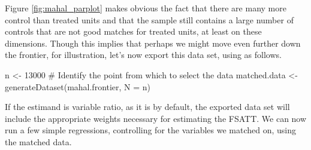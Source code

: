 \documentclass[nojss]{jss}
\begin{document}
Figure \ref{fig:mahal_parplot} makes obvious the fact that there are many more control than 
treated units and that the sample still contains a large number of controls that are
not good matches for treated units, at least on these dimensions. Though this implies that
perhaps we might move even further down the frontier, for illustration, let's now export
this data set, using  as follows.

\begin{CodeChunk}
\begin{CodeInput}
n <- 13000 # Identify the point from which to select the data
matched.data <- generateDataset(mahal.frontier, N = n)
\end{CodeInput}
\end{CodeChunk}

If the estimand is variable ratio, as it is by default, the exported
data set will include the appropriate weights necessary for estimating
the FSATT. We can now run a few simple regressions, controlling for
the variables we matched on, using the matched data.
\end{document}
